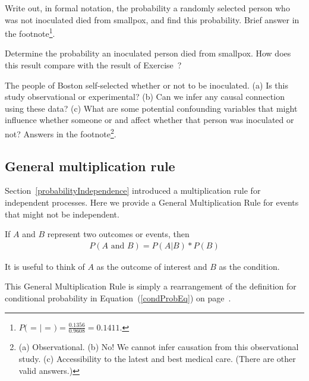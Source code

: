 \begin{exercise} \label{probDiedIfNotInoculated}
Write out, in formal notation, the probability a randomly selected person who was not inoculated died from smallpox, and find this probability. Brief answer in the footnote\footnote{$P($ =  $|$  = $) = \frac{0.1356}{0.9608} = 0.1411$.}.
\end{exercise}

\begin{exercise}
Determine the probability an inoculated person died from smallpox. How does this result compare with the result of Exercise~?
\end{exercise}

\begin{exercise}
The people of Boston self-selected whether or not to be inoculated. (a) Is this study observational or experimental? (b) Can we infer any causal connection using these data? (c) What are some potential confounding variables that might influence whether someone  or  and affect whether that person was inoculated or not? Answers in the footnote\footnote{(a) Observational. (b) No! We cannot infer causation from this observational study. (c) Accessibility to the latest and best medical care. (There are other valid answers.)}.
\end{exercise}

\subsection{General multiplication rule}

Section~\ref{probabilityIndependence} introduced a multiplication rule for independent processes. Here we provide a General Multiplication Rule for events that might not be independent.

\begin{termBox}{
If $A$ and $B$ represent two outcomes or events, then \vspace{-1.5mm}
\begin{eqnarray*}
P(A\text{ and }B) = P(A | B)*P(B)
\end{eqnarray*} \vspace{-6.5mm} \par
It is useful to think of $A$ as the outcome of interest and $B$ as the condition.}
\end{termBox}
This General Multiplication Rule is simply a rearrangement of the definition for conditional probability in Equation~(\ref{condProbEq}) on page~\pageref{condProbEq}.

